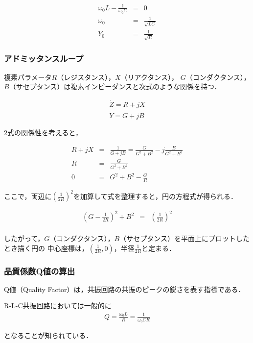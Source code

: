 \documentclass[dvipdfmx,titlepage,a4j]{jsarticle}  %
\numberwithin{equation}{section}
\begin{document}
\begin{eqnarray}
  \omega_0 L - \frac{1}{\omega_0 C} &=& 0 \\
  \omega_0 &=& \frac{1}{\sqrt{LC}} \\
  Y_0 &=& \frac{1}{\sqrt{R}}
\end{eqnarray}

\subsubsection{アドミッタンスループ}

複素パラメータ$R$（レジスタンス），$X$（リアクタンス），
$G$（コンダクタンス），$B$（サセプタンス）は複素インピーダンスと次式のような関係を持つ．

\begin{eqnarray}
  \dot{Z} = R + jX \\
  \dot{Y} = G + jB
\end{eqnarray}

2式の関係性を考えると，

\begin{eqnarray}
  R + jX &=& \frac{1}{G + jB} = \frac{G}{G^2 + B^2} -j\frac{B}{G^2 + B^2} \\
  R &=& \frac{G}{G^2 + B^2} \\
  0 &=& G^2 + B^2 - \frac{G}{R}
\end{eqnarray}

ここで，両辺に$(\frac{1}{2R})^2$を加算して式を整理すると，円の方程式が得られる．

\begin{eqnarray}
  (G - \frac{1}{2R})^2 + B^2 &=& (\frac{1}{2R})^2 \\
\end{eqnarray}

したがって，$G$（コンダクタンス），$B$（サセプタンス）を平面上にプロットしたとき描く円の
中心座標は，$(\frac{1}{2R}, 0)$，半径$\frac{1}{2R}$と定まる．

\subsubsection{品質係数Q値の算出}
Q値（Quality Factor）は，共振回路の共振のピークの鋭さを表す指標である．

R-L-C共振回路においては一般的に
\begin{eqnarray}
  Q = \frac{\omega_0 L}{R} = \frac{1}{\omega_0 CR}
\end{eqnarray}

となることが知られている．
\end{document}
